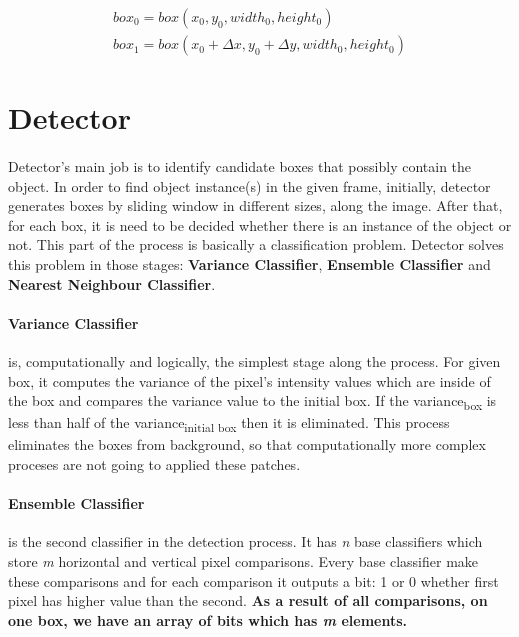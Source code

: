 \documentclass{report}
\begin{document}
            \begin{gather}
                box_{0} = box(x_{0}, y_{0}, width_{0}, height_{0}) \\
                box_{1} = box(x_{0} + \Delta x, y_{0} + \Delta y, width_{0}, height_{0})
            \end{gather}
    \section{Detector}
        \paragraph{}
            Detector's main job is to identify candidate boxes that possibly contain the object. In order to find
            object instance(s) in the given frame, initially, detector generates boxes by sliding window in different sizes,
            along the image. After that, for each box, it is need to be decided whether there is an instance of the object or not.
            This part of the process is basically a classification problem. Detector solves this problem in those stages:
            \textbf{Variance Classifier}, \textbf{Ensemble Classifier} and \textbf{Nearest Neighbour Classifier}.

        \paragraph{Variance Classifier}
            is, computationally and logically, the simplest stage along the process.
            For given box, it computes the variance of the pixel's intensity values which are inside of the box and
            compares the variance value to the initial box. If the variance\textsubscript{box} is less than half of the
            variance\textsubscript{initial box} then it is eliminated. This process eliminates the boxes from background, so that
            computationally more complex proceses are not going to applied these patches.

        \paragraph{Ensemble Classifier} is the second classifier in the detection process. It has
            \emph{n} base classifiers which store \emph{m} horizontal and vertical pixel comparisons.
            Every base classifier make these comparisons and for each comparison it outputs a bit: 1 or 0
            whether first pixel has higher value than the second.
            \textbf{As a result of all comparisons, on one box, we have an array of bits which has \emph{m} elements.}
\end{document}
